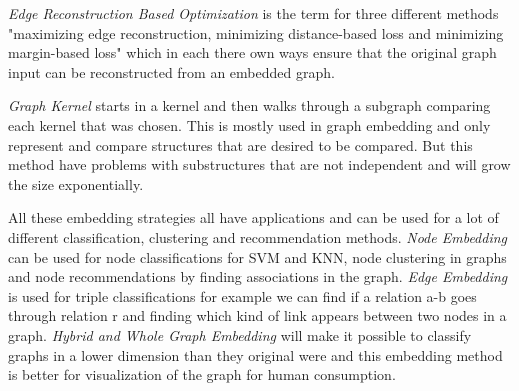\textit{Edge Reconstruction Based Optimization} is the term for three different methods "maximizing edge reconstruction, minimizing distance-based loss and minimizing margin-based loss" which in each there own ways ensure that the original graph input can be reconstructed from an embedded graph.

\textit{Graph Kernel} starts in a kernel and then walks through a subgraph comparing each kernel that was chosen. This is mostly used in graph embedding and only represent and compare structures that are desired to be compared. But this method have problems with substructures that are not independent and will grow the size exponentially.

All these embedding strategies all have applications and can be used for a lot of different classification, clustering and recommendation methods. \textit{Node Embedding} can be used for node classifications for SVM and KNN, node clustering in graphs and node recommendations by finding associations in the graph. \textit{Edge Embedding} is used for triple classifications for example we can find if a relation a-b goes through relation r and finding which kind of link appears between two nodes in a graph. \textit{Hybrid and Whole Graph Embedding} will make it possible to classify graphs in a lower dimension than they original were and this embedding method is better for visualization of the graph for human consumption.
